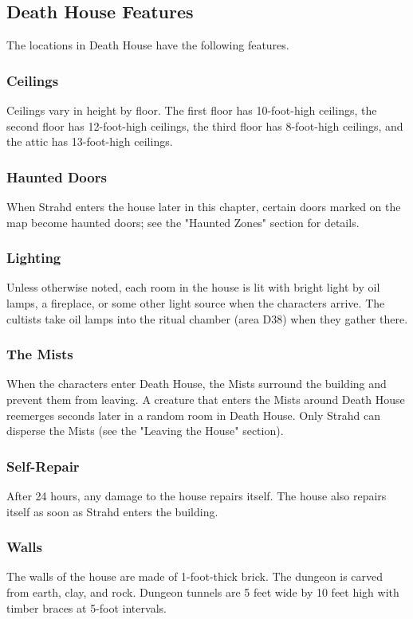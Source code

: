 \documentclass[10pt,a4paper,twoside,bg=print,twocolumn,openany,nodeprecatedcode]{dndbook}
\begin{document}
\subsection{Death House Features}
The locations in Death House have the following features.

\subsubsection{Ceilings}
Ceilings vary in height by floor. The first floor has 10-foot-high ceilings, the second floor has 12-foot-high ceilings, the third floor has 8-foot-high ceilings, and the attic has 13-foot-high ceilings.

\subsubsection{Haunted Doors}
When Strahd enters the house later in this chapter, certain doors marked on the map become haunted doors; see the "Haunted Zones" section for details.

\subsubsection{Lighting}
Unless otherwise noted, each room in the house is lit with bright light by oil lamps, a fireplace, or some other light source when the characters arrive. The cultists take oil lamps into the ritual chamber (area D38) when they gather there.

\subsubsection{The Mists}
When the characters enter Death House, the Mists surround the building and prevent them from leaving. A creature that enters the Mists around Death House reemerges seconds later in a random room in Death House. Only Strahd can disperse the Mists (see the "Leaving the House" section).

\subsubsection{Self-Repair}
After 24 hours, any damage to the house repairs itself. The house also repairs itself as soon as Strahd enters the building.

\subsubsection{Walls}
The walls of the house are made of 1-foot-thick brick. The dungeon is carved from earth, clay, and rock. Dungeon tunnels are 5 feet wide by 10 feet high with timber braces at 5-foot intervals.
\end{document}
